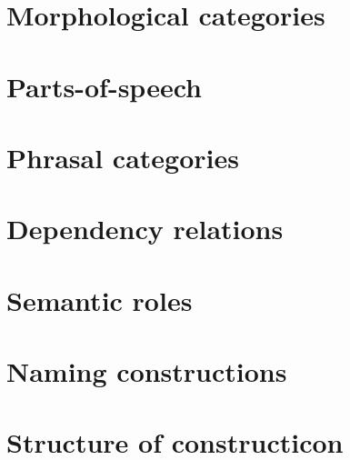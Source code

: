 \documentclass[a4paper,11pt, onecolumn,twoside]{article}
\begin{document}
\section{Morphological categories}

\section{Parts-of-speech}

\section{Phrasal categories}

\section{Dependency relations}

\section{Semantic roles}


\section{Naming constructions}


\section{Structure of constructicon}




% 
\end{document}
